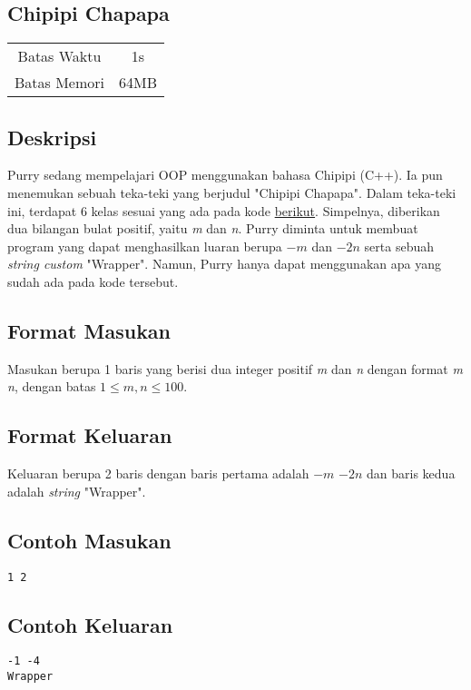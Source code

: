 \documentclass{article}
\begin{document}
\begin{center}

    
    \section*{Chipipi Chapapa}

    \begin{tabular}{ | c c | }
        \hline
        Batas Waktu  & 1s \\
        Batas Memori & 64MB \\
        \hline
    \end{tabular}

    
\end{center}

\subsection*{Deskripsi}

Purry sedang mempelajari OOP menggunakan bahasa Chipipi (C++). Ia pun menemukan sebuah teka-teki yang berjudul "Chipipi Chapapa". Dalam teka-teki ini, terdapat 6 kelas sesuai yang ada pada kode \href{https://drive.google.com/file/d/14HL7qtTQEweuAHRCAryBxWxXb4_PrH0d/view?usp=drive_link}{berikut}. Simpelnya, diberikan dua bilangan bulat positif, yaitu \textit{m} dan \textit{n}. Purry diminta untuk membuat program yang dapat menghasilkan luaran berupa \(-m\) dan \(-2n\) serta sebuah \textit{string custom} "Wrapper". Namun, Purry hanya dapat menggunakan apa yang sudah ada pada kode tersebut.

\subsection*{Format Masukan}

Masukan berupa 1 baris yang berisi dua integer positif \textit{m} dan \textit{n} dengan format \textit{m} \textit{n}, dengan batas \(1 \leq m, n \leq 100\).

\subsection*{Format Keluaran}

Keluaran berupa 2 baris dengan baris pertama adalah \(-m\) \(-2n\) dan baris kedua adalah \textit{string} "Wrapper".

\begin{multicols}{2}
\subsection*{Contoh Masukan}
\begin{lstlisting}
1 2
\end{lstlisting}
\columnbreak
\subsection*{Contoh Keluaran}
\begin{lstlisting}
-1 -4
Wrapper
\end{lstlisting}
\vfill
\null
\end{multicols}
\end{document}
